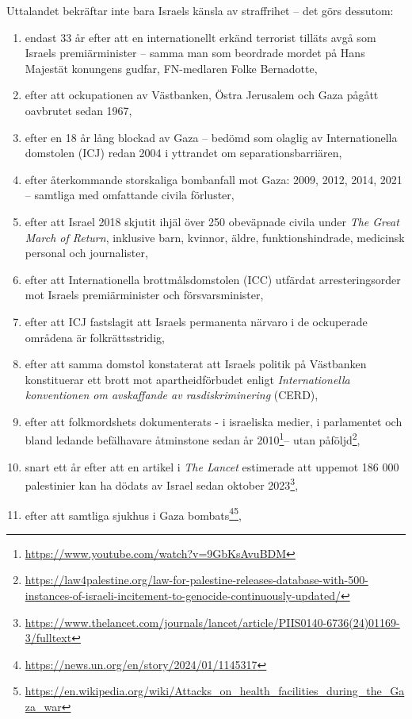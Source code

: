 Uttalandet bekräftar inte bara Israels känsla av straffrihet – det görs dessutom:
\begin{enumerate}
\item endast 33 år efter att en internationellt erkänd terrorist tilläts avgå som Israels premiärminister – samma man som beordrade mordet på Hans Majestät konungens gudfar, FN-medlaren Folke Bernadotte,
\item efter att ockupationen av Västbanken, Östra Jerusalem och Gaza pågått oavbrutet sedan 1967,
\item efter en 18 år lång blockad av Gaza – bedömd som olaglig av Internationella domstolen (ICJ) redan 2004 i yttrandet om separationsbarriären,
\item efter återkommande storskaliga bombanfall mot Gaza: 2009, 2012, 2014, 2021 – samtliga med omfattande civila förluster,
\item efter att Israel 2018 skjutit ihjäl över 250 obeväpnade civila under \textit{The Great March of Return}, inklusive barn, kvinnor, äldre, funktionshindrade, medicinsk personal och journalister,
\item efter att Internationella brottmålsdomstolen (ICC) utfärdat arresteringsorder mot Israels premiärminister och försvarsminister,
\item efter att ICJ fastslagit att Israels permanenta närvaro i de ockuperade områdena är folkrättsstridig,
\item efter att samma domstol konstaterat att Israels politik på Västbanken konstituerar ett brott mot apartheidförbudet enligt \textit{Internationella konventionen om avskaffande av rasdiskriminering} (CERD),
\item efter att folkmordshets dokumenterats - i israeliska medier, i parlamentet och bland ledande befälhavare åtminstone sedan år 2010\footnote{\url{https://www.youtube.com/watch?v=9GbKsAvuBDM}}– utan påföljd\footnote{\url{https://law4palestine.org/law-for-palestine-releases-database-with-500-instances-of-israeli-incitement-to-genocide-continuously-updated/}},
\item snart ett år efter att en artikel i \textit{The Lancet} estimerade att uppemot 186 000 palestinier kan ha dödats av Israel sedan oktober 2023\footnote{\url{https://www.thelancet.com/journals/lancet/article/PIIS0140-6736(24)01169-3/fulltext}},
\item efter att samtliga sjukhus i Gaza bombats\footnote{\url{https://news.un.org/en/story/2024/01/1145317}}\footnote{\url{https://en.wikipedia.org/wiki/Attacks_on_health_facilities_during_the_Gaza_war}},

\end{enumerate}
